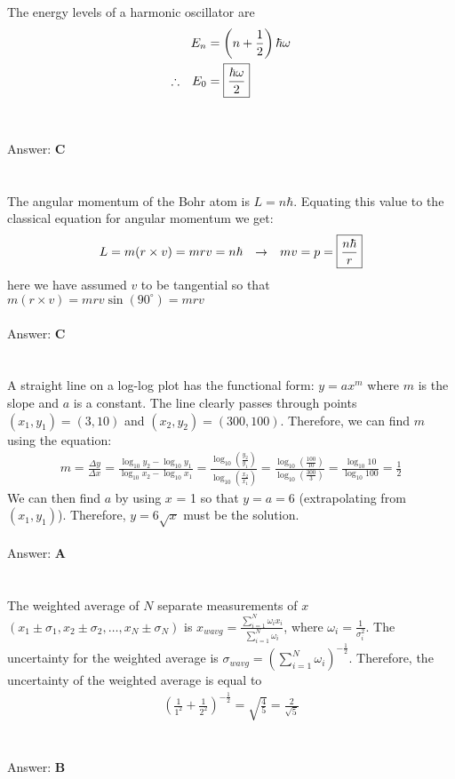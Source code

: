 \documentclass[12pt]{article}
\newcommand{\Answer}[1]{Answer: \textbf{#1}}
\newcommand{\Problem}[3]{
    \setcounter{section}{#1}
    \addtocounter{section}{-1}
    \section{}
    #3\\\\
    \Answer{#2}
}
\begin{document}
\Problem{11}{C}{
The energy levels of a harmonic oscillator are
\begin{align}
E_n &= \left(n+\frac{1}{2}\right)\hbar\omega\\
\therefore \hspace{.1in} E_0 &= \boxed{\frac{\hbar\omega}{2}}\nonumber
\end{align}
}

\Problem{12}{C}{
The angular momentum of the Bohr atom is $L = n\hbar$. Equating this value to the classical equation for angular momentum we get:
\begin{align}
L = m(r \times v) = mrv = n\hbar \hspace{.1in}  \rightarrow \hspace{.1in}  mv = p = \boxed{\frac{n\hbar}{r}}
\end{align}
here we have assumed $v$ to be tangential so that $m(r \times v) = m r v \sin{(90^{\circ})} = mrv$
}

\Problem{13}{A}{
A straight line on a log-log plot has the functional form: \textbf{$y = ax^{m}$} where $m$ is the slope and $a$ is a constant. The line clearly passes through points $(x_{1}, y_{1} ) = (3,10)$ and $(x_{2}, y_{2} ) = (300,100)$. Therefore, we can find $m$ using the equation:
\begin{align}
m =\frac{\Delta y}{ \Delta x} = \frac{\log_{10} y_{2} - \log_{10} y_{1}}{\log_{10} x_{2} - \log_{10} x_{1}} = \frac{\log_{10}\left(\frac{y_{2}}{y_{1}}\right)}{\log_{10}\left(\frac{x_{2}}{x_{1}}\right)} = \frac{\log_{10}\left(\frac{100}{10}\right)}{\log_{10}\left(\frac{300}{3}\right)} = \frac{\log_{10}10}{\log_{10}100} = \frac{1}{2}\nonumber
\end{align}
We can then find $a$ by using $x$ = 1 so that $y = a = 6$ (extrapolating from $(x_{1}, y_{1})$). Therefore, $y = 6\sqrt{x}$ must be the solution.
}

\Problem{14}{B}{The weighted average of $N$ separate measurements  of $x$ $(x_1\pm\sigma_1, x_2\pm\sigma_2, \ldots, x_N\pm\sigma_N)$ is $x_{wavg} = \frac{\sum_{i=1}^{N}\omega_i x_i}{\sum_{i=1}^{N}\omega_i}$, where $\omega_i = \frac{1}{\sigma_i^2}$. The uncertainty for the weighted average is $\sigma_{wavg} = {\left(\sum_{i=1}^{N}\omega_i\right)}^{-\frac{1}{2}}$. Therefore, the uncertainty of the weighted average is equal to
\begin{align}
{\left(\frac{1}{1^2}+\frac{1}{2^2}\right)}^{-\frac{1}{2}}= \sqrt{\frac{4}{5}} = \boxed{\frac{2}{\sqrt{5}}}\nonumber
\end{align}
}
\end{document}
